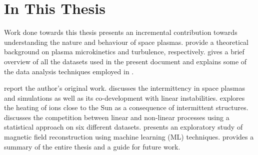     \section{In This Thesis} \label{sec:plas4}

        Work done towards this thesis presents an incremental contribution towards understanding the
        nature and behaviour of space plasmas.  provide a theoretical
        background on plasma microkinetics and turbulence, respectively.  gives a
        brief overview of all the datasets used in the present document and explains some of the
        data analysis techniques employed in .

         report the author's original work. 
        discusses the intermittency in space plasmas and simulations as well as its co-development
        with linear instabilities.  explores the heating of ions close to the Sun
        as a consequence of intermittent structures.  discusses the competition
        between linear and non-linear processes using a statistical approach on six different
        datasets.  presents an exploratory study of magnetic field reconstruction
        using machine learning (ML) techniques.  provides a summary of the entire
        thesis and a guide for future work.